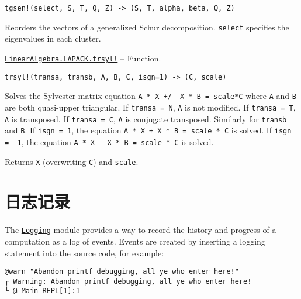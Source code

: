 \begin{adjustwidth}{2em}{0pt}


\begin{verbatim}
tgsen!(select, S, T, Q, Z) -> (S, T, alpha, beta, Q, Z)
\end{verbatim}

Reorders the vectors of a generalized Schur decomposition. \texttt{select} specifies the eigenvalues in each cluster.



\end{adjustwidth}
\hypertarget{853281004697696312}{} 
\hyperlink{853281004697696312}{\texttt{LinearAlgebra.LAPACK.trsyl!}}  -- {Function.}

\begin{adjustwidth}{2em}{0pt}


\begin{verbatim}
trsyl!(transa, transb, A, B, C, isgn=1) -> (C, scale)
\end{verbatim}

Solves the Sylvester matrix equation \texttt{A * X +/- X * B = scale*C} where \texttt{A} and \texttt{B} are both quasi-upper triangular. If \texttt{transa = N}, \texttt{A} is not modified. If \texttt{transa = T}, \texttt{A} is transposed. If \texttt{transa = C}, \texttt{A} is conjugate transposed. Similarly for \texttt{transb} and \texttt{B}. If \texttt{isgn = 1}, the equation \texttt{A * X + X * B = scale * C} is solved. If \texttt{isgn = -1}, the equation \texttt{A * X - X * B = scale * C} is solved.

Returns \texttt{X} (overwriting \texttt{C}) and \texttt{scale}.



\end{adjustwidth}



\hypertarget{16565866334883334127}{}


\chapter{日志记录}



The \hyperlink{1488091939099076420}{\texttt{Logging}} module provides a way to record the history and progress of a computation as a log of events.  Events are created by inserting a logging statement into the source code, for example:




\begin{verbatim}
@warn "Abandon printf debugging, all ye who enter here!"
┌ Warning: Abandon printf debugging, all ye who enter here!
└ @ Main REPL[1]:1
\end{verbatim}



